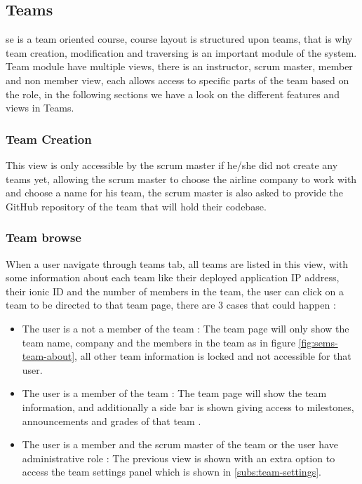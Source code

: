 \subsection{Teams}
\label{sub:teams}
\ac{se} is a team oriented course, course layout is structured upon teams, that is why team creation, modification and traversing is an
important module of the system. Team module have multiple views, there is an instructor, scrum master, member and non member view, each
allows access to specific parts of the team based on the role, in the following sections we have a look on the different features and views
in Teams.

\subsubsection{Team Creation}
\label{subs:team-creation}
This view is only accessible by the scrum master if he/she did not create any teams yet, allowing the scrum master to choose the airline company
to work with and choose a name for his team, the scrum master is also asked to provide the GitHub repository of the team that will hold
their codebase.

\subsubsection{Team browse}
\label{subs:team-browse}
When a user navigate through teams tab, all teams are listed in this view, with some information about each team like their deployed application
IP address, their ionic ID  and the number of members in the team, the user can click on a team to
be directed to that team page, there are 3 cases that could happen :
\begin{itemize}
  \item The user is a not a member of the team : The team page will only show the team name, company and the members in the team as in
  figure \ref{fig:sems-team-about}, all other team information is locked and not accessible for that user.
  \item The user is a member of the team : The team page will show the team information, and additionally a side bar is shown
  giving access to milestones, announcements and grades of that team .
  \item The user is a member and the scrum master of the team or the user have administrative role : The previous view is shown with an extra
  option to access the team settings panel which is shown in \ref{subs:team-settings}.
\end{itemize}

